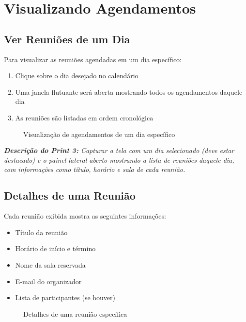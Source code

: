 \documentclass[12pt,a4paper]{article}
\begin{document}
\section{Visualizando Agendamentos}

\subsection{Ver Reuniões de um Dia}

Para visualizar as reuniões agendadas em um dia específico:

\begin{enumerate}[leftmargin=*]
    \item Clique sobre o dia desejado no calendário
    \item Uma janela flutuante será aberta mostrando todos os agendamentos daquele dia
    \item As reuniões são listadas em ordem cronológica
\end{enumerate}

\begin{figure}[H]
    \centering
    \caption{Visualização de agendamentos de um dia específico}
    \label{fig:ver_dia}
\end{figure}

\textit{\textbf{Descrição do Print 3:} Capturar a tela com um dia selecionado (deve estar destacado) e o painel lateral aberto mostrando a lista de reuniões daquele dia, com informações como título, horário e sala de cada reunião.}

\subsection{Detalhes de uma Reunião}

Cada reunião exibida mostra as seguintes informações:

\begin{itemize}[leftmargin=*]
    \item Título da reunião
    \item Horário de início e término
    \item Nome da sala reservada
    \item E-mail do organizador
    \item Lista de participantes (se houver)
\end{itemize}

\begin{figure}[H]
    \centering
    \caption{Detalhes de uma reunião específica}
    \label{fig:detalhes}
\end{figure}
\end{document}
